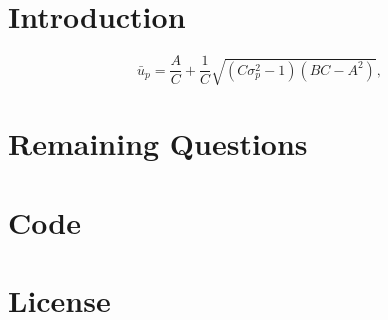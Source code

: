 \documentclass[a4paper]{article}
\title{\documenttitle}
\date{\today}
\author{Frans Englich \\
        \href{mailto:fenglich@fastmail.fm}{fenglich@fastmail.fm}}
\begin{document}
\maketitle

\section{Introduction}



 




\begin{equation*}
    \bar{u}_p = \frac{A}{C} + \frac{1}{C} \sqrt{(C\sigma^2_p - 1)(BC - A^2)},
\end{equation*}

\section{Remaining Questions}

\printbibliography

\appendix

\section{Code}

%

\section{License}

\doclicenseThis
\end{document}
